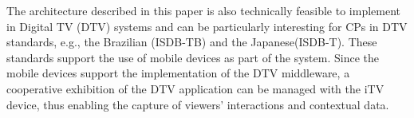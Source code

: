 \documentclass[journal]{IEEEtran}
\begin{document}
The architecture described in this paper is also technically feasible to implement in Digital TV (DTV) systems and can be particularly interesting for CPs in DTV standards, e.g., the Brazilian (ISDB-TB) and the Japanese(ISDB-T). These standards support the use of mobile devices as part of the system. Since the mobile devices support the implementation of the DTV middleware, a cooperative exhibition of the DTV application can be managed with the iTV device, thus enabling the capture of viewers' interactions and contextual data.



\end{document}
